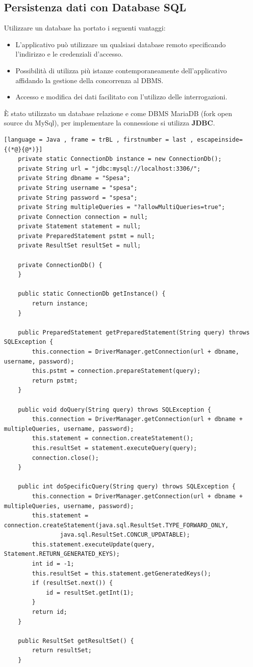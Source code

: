 \documentclass{article}
\begin{document}
\subsection{Persistenza dati con Database SQL}
Utilizzare un database ha portato i seguenti vantaggi:
\begin{itemize}
	\item{
	      L'applicativo può utilizzare un qualsiasi database remoto specificando l'indirizzo e le credenziali d'accesso.}

	\item{
	      Possibilità di utilizza più istanze contemporaneamente dell'applicativo affidando la gestione
	      della concorrenza al DBMS.}
	\item{
	      Accesso e modifica dei dati facilitato con l'utilizzo delle interrogazioni.}
\end{itemize}


\noindent \`E stato utilizzato un database relazione e come DBMS MariaDB (fork open source du MySql),
per implementare la connessione si utilizza \textbf{JDBC}.
\newpage
\begin{lstlisting}[language = Java , frame = trBL , firstnumber = last , escapeinside={(*@}{@*)}]
    private static ConnectionDb instance = new ConnectionDb();
    private String url = "jdbc:mysql://localhost:3306/";
    private String dbname = "Spesa";
    private String username = "spesa";
    private String password = "spesa";
    private String multipleQueries = "?allowMultiQueries=true";
    private Connection connection = null;
    private Statement statement = null;
    private PreparedStatement pstmt = null;
    private ResultSet resultSet = null;

    private ConnectionDb() {
    }

    public static ConnectionDb getInstance() {
        return instance;
    }

    public PreparedStatement getPreparedStatement(String query) throws SQLException {
        this.connection = DriverManager.getConnection(url + dbname, username, password);
        this.pstmt = connection.prepareStatement(query);
        return pstmt;
    }

    public void doQuery(String query) throws SQLException {
        this.connection = DriverManager.getConnection(url + dbname + multipleQueries, username, password);
        this.statement = connection.createStatement();
        this.resultSet = statement.executeQuery(query);
        connection.close();
    }

    public int doSpecificQuery(String query) throws SQLException {
        this.connection = DriverManager.getConnection(url + dbname + multipleQueries, username, password);
        this.statement = connection.createStatement(java.sql.ResultSet.TYPE_FORWARD_ONLY,
                java.sql.ResultSet.CONCUR_UPDATABLE);
        this.statement.executeUpdate(query, Statement.RETURN_GENERATED_KEYS);
        int id = -1;
        this.resultSet = this.statement.getGeneratedKeys();
        if (resultSet.next()) {
            id = resultSet.getInt(1);
        }
        return id;
    }

    public ResultSet getResultSet() {
        return resultSet;
    }
\end{lstlisting}
\newpage
\end{document}
